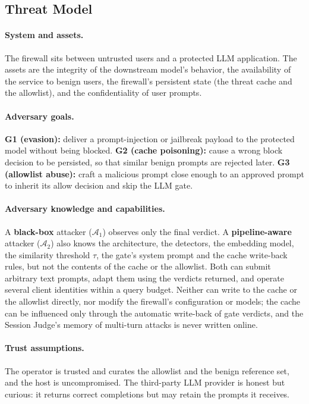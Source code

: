 \documentclass[runningheads]{llncs}
\newif\ifrev
\newcommand{\rev}[1]{\ifrev\hl{#1}\else#1\fi}                  %
\begin{document}
\subsection{\texorpdfstring{\protect\rev{Threat Model}}{Threat Model}}
\label{sec:threat-model}

\paragraph{\protect\rev{System and assets.}}
\rev{The firewall sits between untrusted users and a protected LLM application. The assets are the integrity of the downstream model's behavior, the availability of the service to benign users, the firewall's persistent state (the threat cache and the allowlist), and the confidentiality of user prompts.}

\paragraph{\protect\rev{Adversary goals.}}
\rev{\textbf{G1 (evasion):} deliver a prompt-injection or jailbreak payload to the protected model without being blocked. \textbf{G2 (cache poisoning):} cause a wrong block decision to be persisted, so that similar benign prompts are rejected later. \textbf{G3 (allowlist abuse):} craft a malicious prompt close enough to an approved prompt to inherit its allow decision and skip the LLM gate.}

\paragraph{\protect\rev{Adversary knowledge and capabilities.}}
\rev{A \textbf{black-box} attacker ($\mathcal{A}_1$) observes only the final verdict. A \textbf{pipeline-aware} attacker ($\mathcal{A}_2$) also knows the architecture, the detectors, the embedding model, the similarity threshold $\tau$, the gate's system prompt and the cache write-back rules, but not the contents of the cache or the allowlist. Both can submit arbitrary text prompts, adapt them using the verdicts returned, and operate several client identities within a query budget. Neither can write to the cache or the allowlist directly, nor modify the firewall's configuration or models; the cache can be influenced only through the automatic write-back of gate verdicts, and the Session Judge's memory of multi-turn attacks is never written online.}

\paragraph{\protect\rev{Trust assumptions.}}
\rev{The operator is trusted and curates the allowlist and the benign reference set, and the host is uncompromised. The third-party LLM provider is honest but curious: it returns correct completions but may retain the prompts it receives.}
\end{document}
